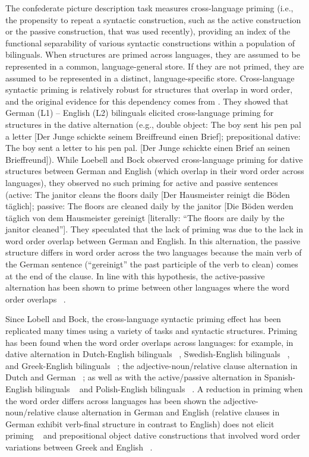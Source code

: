 The confederate picture description task measures cross-language priming (i.e., the propensity to repeat a syntactic construction, such as the active construction or the passive construction, that was used recently), providing an index of the functional separability of various syntactic constructions within a population of bilinguals. When structures are primed across languages, they are assumed to be represented in a common, language-general store. If they are not primed, they are assumed to be represented in a distinct, language-specific store. Cross-language syntactic priming is relatively robust for structures that overlap in word order, and the original evidence for this dependency comes from  \citet{Loebell2003}. They showed that German (L1) -- English (L2) bilinguals elicited cross-language priming for structures in the dative alternation (e.g., double object: The boy sent his pen pal a letter [Der Junge schickte seinem Breiffreund einen Brief]; prepositional dative: The boy sent a letter to his pen pal. [Der Junge schickte einen Brief an seinen Brieffreund]). While Loebell and Bock observed cross-language priming for dative structures between German and English (which overlap in their word order across languages), they observed no such priming for active and passive sentences (active: The janitor cleans the floors daily [Der Hausmeister reinigt die B\"{o}den t\"{a}glich]; passive: The floors are cleaned daily by the janitor [Die B\"{o}den werden t\"{a}glich von dem Hausmeister gereinigt [literally: ``The floors are daily by the janitor cleaned'']. They speculated that the lack of priming was due to the lack in word order overlap between German and English. In this alternation, the passive structure differs in word order across the two languages because the main verb of the German sentence (``gereinigt'' the past participle of the verb to clean) comes at the end of the clause. In line with this hypothesis, the active-passive alternation has been shown to prime between other languages where the word order overlaps ~\citep[e.g., Spanish and English][]{Hartsuiker2004}. 

Since Lobell and Bock, the cross-language syntactic priming effect has been replicated many times using a variety of tasks and syntactic structures. Priming has been found when the word order overlaps across languages: for example, in dative alternation in Dutch-English bilinguals ~\citep{Schoonbaert2007}, Swedish-English bilinguals ~\citep{Kantola2011}, and Greek-English bilinguals ~\citep{Salamoura2007}; the adjective-noun\slash relative clause alternation in Dutch and German ~\citep{Bernolet2007}; as well as with the active\slash passive alternation in Spanish-English bilinguals ~\citep{Hartsuiker2004} and Polish-English bilinguals ~\citep{Fleischer2012}. A reduction in priming when the word order differs across languages has been shown the adjective-noun\slash relative clause alternation in German and English (relative clauses in German exhibit verb-final structure in contrast to English) does not elicit priming ~\citep{Bernolet2007} and prepositional object dative constructions that involved word order variations between Greek and English ~\citep{Salamoura2007}. 


